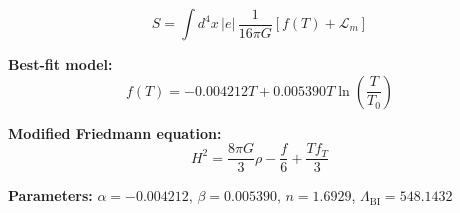 
\begin{equation}
  S = \int d^4x \, |e| \, \frac{1}{16\pi G} \left[ f(T) + \mathcal{L}_m \right]
\end{equation}

\textbf{Best-fit model:}
\begin{equation}
  f(T) = -0.004212 T + 0.005390 T \ln\!\left(\frac{T}{T_0}\right)
\end{equation}

\textbf{Modified Friedmann equation:}
\begin{equation}
  H^2 = \frac{8\pi G}{3} \rho - \frac{f}{6} + \frac{T f_T}{3}
\end{equation}

\textbf{Parameters:}
$\alpha = -0.004212$, \quad
$\beta = 0.005390$, \quad
$n = 1.6929$, \quad
$\Lambda_{\text{BI}} = 548.1432$
